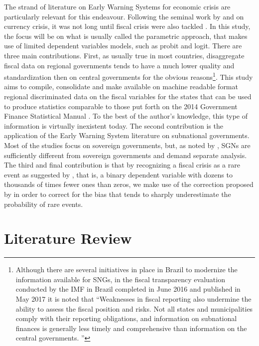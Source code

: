 \documentclass[12pt]{article}
\begin{document}
The strand of literature on Early Warning Systems for economic crisis are particularly relevant for this endeavour. Following the seminal work by \citet{kaminsky1998} and \citet{berg1999} on currency crisis, it was not long until fiscal crisis were also tackled \citep{manasse2003, baldacci2011b, berti2012, dawood2017}. In this study, the focus will be on what is usually called the parametric approach, that makes use of limited dependent variables models, such as probit and logit. There are three main contributions. First, as usually true in most countries, disaggregate fiscal data on regional governments tends to have a much lower quality and standardization then on central governments for the obvious reasons\footnote{Although there are several initiatives in place in Brazil to modernize the information available for SNGs, in the fiscal transparency evaluation conducted by the IMF in Brazil completed in June 2016 and published in May 2017 it is noted that ``Weaknesses in fiscal reporting also undermine the ability to assess the fiscal position and risks. Not all states and municipalities comply with their reporting obligations, and information on subnational finances is generally less timely and comprehensive than information on the central governments. \citep[p. 62]{imf2017}''}. This study aims to compile, consolidate and make available on machine readable format regional discriminated data on the fiscal variables for the states that can be used to produce statistics comparable to those put forth on the 2014 Government Finance Statistical Manual \citep{imf2014}. To the best of the author's knowledge, this type of information is virtually inexistent today. The second contribution is the application of the Early Warning System literature on subnational governments. Most of the studies focus on sovereign governments, but, as noted by \citet{ianchovichina2007}, SGNs are sufficiently different from sovereign governments and demand separate analysis. The third and final contribution is that by recognizing a fiscal crisis as a rare event as suggested by \citet{king2001a}, that is, a binary dependent variable with dozens to thousands of times fewer ones than zeros, we make use of the correction proposed by \citet{king2001b} in order to correct for the bias that tends to sharply underestimate the probability of rare events.

\newpage
\section{Literature Review}
\end{document}
